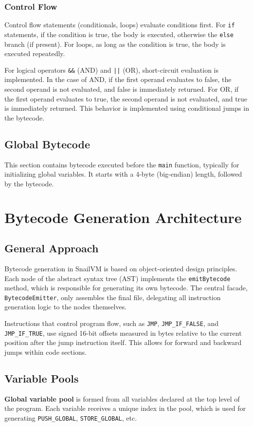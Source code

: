 \documentclass[a4paper,12pt]{article}
\begin{document}
    \subsubsection{Control Flow}
    Control flow statements (conditionals, loops) evaluate conditions first. For \texttt{if} statements, if the condition is true, the body is executed, otherwise the \texttt{else} branch (if present). For loops, as long as the condition is true, the body is executed repeatedly.

    For logical operators \texttt{\&\&} (AND) and \texttt{||} (OR), short-circuit evaluation is implemented. In the case of AND, if the first operand evaluates to false, the second operand is not evaluated, and false is immediately returned. For OR, if the first operand evaluates to true, the second operand is not evaluated, and true is immediately returned. This behavior is implemented using conditional jumps in the bytecode.
    \subsection{Global Bytecode}
    This section contains bytecode executed before the \texttt{main} function, typically for initializing global variables. It starts with a 4-byte (big-endian) length, followed by the bytecode.

    \section{Bytecode Generation Architecture}

    \subsection{General Approach}
    Bytecode generation in SnailVM is based on object-oriented design principles. Each node of the abstract syntax tree (AST) implements the \texttt{emitBytecode} method, which is responsible for generating its own bytecode. The central facade, \texttt{BytecodeEmitter}, only assembles the final file, delegating all instruction generation logic to the nodes themselves.

    Instructions that control program flow, such as \texttt{JMP}, \texttt{JMP\_IF\_FALSE}, and \texttt{JMP\_IF\_TRUE}, use signed 16-bit offsets measured in bytes relative to the current position after the jump instruction itself. This allows for forward and backward jumps within code sections.

    \subsection{Variable Pools}
    \textbf{Global variable pool} is formed from all variables declared at the top level of the program. Each variable receives a unique index in the pool, which is used for generating \texttt{PUSH\_GLOBAL}, \texttt{STORE\_GLOBAL}, etc.
\end{document}
